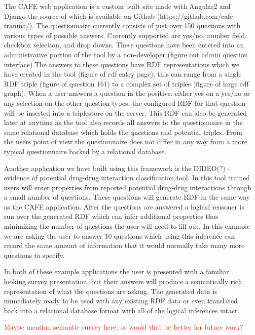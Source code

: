 \documentclass{amia}
\begin{document}
The CAFE web application is a custom built site made with Angular2 and Django the source of which is available on Github (https://github.com/cafe-trauma/).
The questionnaire currently consists of just over 150 questions with various types of possible answers.
Currently supported are yes/no, number field, checkbox selection, and drop downs.
These questions have been entered into an administrative portion of the tool by a non-developer (figure out admin question interface)  The answers to these questions have RDF representations which we have created in the tool (figure of rdf entry page), this can range from a single RDF triple (figure of question 161) to a complex set of triples (figure of large rdf graph).
When a user answers a question in the positive, either yes on a yes/no or any selection on the other question types, the configured RDF for that question will be inserted into a triplestore on the server.
This RDF can also be generated later at anytime as the tool also records all answers to the questionnaire in the same relational database which holds the questions and potential triples.
From the users point of view the questionnaire does not differ in any way from a more typical questionnaire backed by a relational database.

Another application we have built using this framework is the DIDEO(?) - evidence of potential drug-drug interaction classification tool.
In this tool trained users will enter properties from reported potential drug-drug interactions through a small number of questions.
These questions will generate RDF in the same way as the CAFE application.
After the questions are answered a logical reasoner is run over the generated RDF which can infer additional properties thus minimizing the number of questions the user will need to fill out.
In this example we are asking the user to answer 10 questions which using this inference can record the same amount of information that it would normally take many more questions to specify.

In both of these example applications the user is presented with a familiar looking survey presentation, but their answers will produce a semantically rich representation of what the questions are asking.  The generated data is immediately ready to be used with any existing RDF data or even translated back into a relational database format with all of the logical inferences intact.

\textcolor{red}{Maybe mention semantic survey here, or would that be better for future work?}
\end{document}
